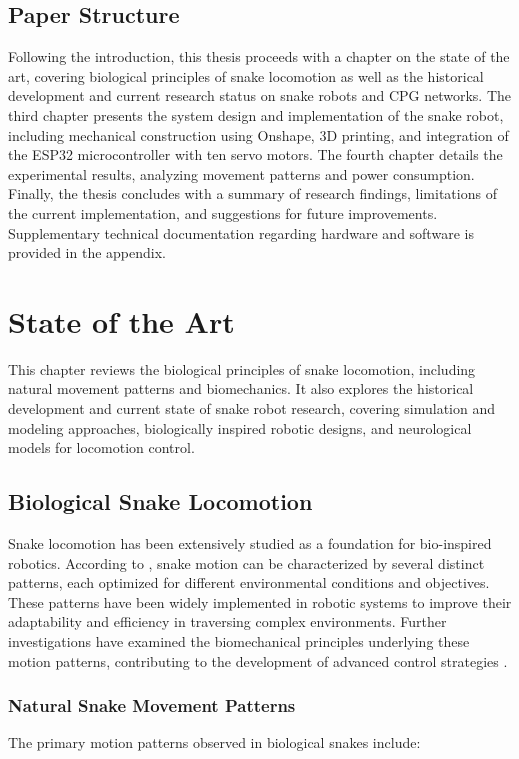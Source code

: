 \documentclass[12pt,a4paper]{report}
\begin{document}
\section{Paper Structure}
Following the introduction, this thesis proceeds with a chapter on the state of the art, covering biological principles of snake locomotion as well as the historical development and current research status on snake robots and CPG networks. The third chapter presents the system design and implementation of the snake robot, including mechanical construction using Onshape, 3D printing, and integration of the ESP32 microcontroller with ten servo motors. The fourth chapter details the experimental results, analyzing movement patterns and power consumption. Finally, the thesis concludes with a summary of research findings, limitations of the current implementation, and suggestions for future improvements. Supplementary technical documentation regarding hardware and software is provided in the appendix.

\chapter{State of the Art}

This chapter reviews the biological principles of snake locomotion, including natural movement patterns and biomechanics. It also explores the historical development and current state of snake robot research, covering simulation and modeling approaches, biologically inspired robotic designs, and neurological models for locomotion control.

\section{Biological Snake Locomotion}
Snake locomotion has been extensively studied as a foundation for bio-inspired robotics. According to \textcite{liljeback-2013}, snake motion can be characterized by several distinct patterns, each optimized for different environmental conditions and objectives. These patterns have been widely implemented in robotic systems to improve their adaptability and efficiency in traversing complex environments.
Further investigations have examined the biomechanical principles underlying these motion patterns, contributing to the development of advanced control strategies \cite{lamping-2022}.

\subsection{Natural Snake Movement Patterns}
The primary motion patterns observed in biological snakes include:
\end{document}
